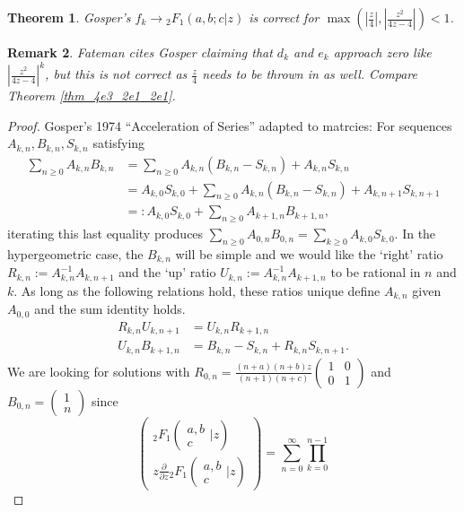 \documentclass[12pt]{article}
\numberwithin{equation}{section}
\newtheorem{theorem}{Theorem}[section]
\newtheorem{remark}[theorem]{Remark}
\newcommand{\Head}[3] {{}_{#1}{#2}_{#3}}
\newcommand{\ArgS}[3] {( \begin{smallmatrix} #1 \\ #2 \end{smallmatrix} | {#3})}
\begin{document}
\begin{theorem}
Gosper's $f_k \to \Head{2}{F}{1}(a,b;c|z)$ is correct for $\max(|\frac{z}{4}|,|\frac{z^2}{4z-4}|)<1$.
\end{theorem}
\begin{remark}
Fateman cites Gosper claiming that $d_k$ and $e_k$ approach zero like $|\frac{z^2}{4z-4}|^k$, but this is not correct as $\frac{z}{4}$ needs to be thrown in as well. Compare Theorem \ref{thm_4e3_2e1_2e1}.
\end{remark}
\begin{proof}
Gosper's 1974 ``Acceleration of Series'' adapted to matrcies: For sequences $A_{k,n}, B_{k,n}, S_{k,n}$ satisfying
\begin{align*}
\sum_{n \ge 0} A_{k,n} B_{k,n} &= \sum_{n \ge 0} A_{k,n} (B_{k,n}-S_{k,n}) + A_{k,n} S_{k,n}\\
&= A_{k,0} S_{k,0} + \sum_{n \ge 0} A_{k,n} (B_{k,n}-S_{k,n}) + A_{k,n+1} S_{k,n+1}\\
&=: A_{k,0} S_{k,0} + \sum_{n \ge 0} A_{k+1,n} B_{k+1,n}\text{,}
\end{align*}
iterating this last equality produces $\sum_{n \ge 0} A_{0,n} B_{0,n} = \sum_{k \ge 0} A_{k,0} S_{k,0}$. In the hypergeometric case, the $B_{k,n}$ will be simple and we would like the `right' ratio $R_{k,n} := A_{k,n}^{-1} A_{k,n+1}$ and the `up' ratio $U_{k,n} := A_{k,n}^{-1} A_{k+1,n}$ to be rational in $n$ and $k$. As long as the following relations hold, these ratios unique define $A_{k,n}$ given $A_{0,0}$ and the sum identity holds.
\begin{align*}
R_{k,n} U_{k,n+1} &= U_{k,n} R_{k+1,n}\\
U_{k,n} B_{k+1,n} &= B_{k,n} - S_{k,n} + R_{k,n}S_{k,n+1}\text{.}
\end{align*}
We are looking for solutions with $R_{0,n} = \frac{(n+a)(n+b)z}{(n+1)(n+c)} (\begin{smallmatrix}
1 & 0 \\
0 & 1
\end{smallmatrix})$ and $B_{0,n} = (\begin{smallmatrix}
1 \\
n
\end{smallmatrix})$ since
\begin{equation*}
\begin{pmatrix}
\Head{2}{F}{1} \ArgS{a,b}{c}{z} \\ z \frac{\partial}{\partial z} \Head{2}{F}{1}\ArgS{a,b}{c}{z}
\end{pmatrix}
 = \sum_{n=0}^{\infty}
\prod_{k=0}^{n-1}

\end{equation*}
\end{proof}
\end{document}

